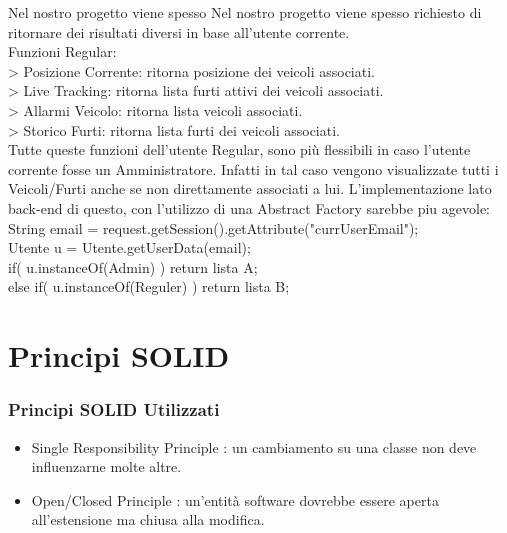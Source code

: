 \documentclass[a4paper,12pt]{beamer}
\begin{document}
\begin{frame}
Nel nostro progetto viene spesso 
Nel nostro progetto viene spesso richiesto di ritornare dei risultati diversi in base all'utente corrente.\\
Funzioni Regular:\\
> Posizione Corrente: ritorna posizione dei veicoli associati.\\
> Live Tracking: ritorna lista furti attivi dei veicoli associati.\\
> Allarmi Veicolo: ritorna lista veicoli associati.\\
> Storico Furti: ritorna lista furti dei veicoli associati.\\
Tutte queste funzioni dell'utente Regular, sono più flessibili in caso l'utente corrente fosse un Amministratore. Infatti in tal caso vengono visualizzate tutti i Veicoli/Furti anche se non direttamente associati a lui.
L'implementazione lato back-end di questo, con l'utilizzo di una Abstract Factory sarebbe piu agevole:\\
\small{
String email = request.getSession().getAttribute("currUserEmail");\\
Utente u = Utente.getUserData(email);\\
if( u.instanceOf(Admin) ) return lista A;\\
else if( u.instanceOf(Reguler) ) return lista B;}
\end{frame}

\pagebreak

\section{Principi SOLID}
\begin{frame}
\frametitle{Principi SOLID Utilizzati}
\begin{itemize}
\item Single Responsibility Principle : un cambiamento su una classe non deve influenzarne molte altre.
\item Open/Closed Principle : un'entità software dovrebbe essere aperta all'estensione ma chiusa alla modifica.
\end{itemize}
\end{frame}

\pagebreak
\end{document}

